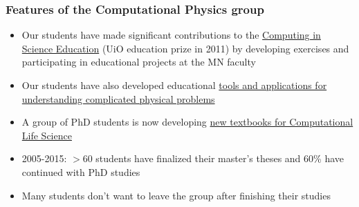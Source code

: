 \documentclass{beamer}
\begin{document}
\begin{frame}
\frametitle{Features of the Computational Physics group}

\begin{block}{}
\begin{itemize}
\item Our students have made significant contributions to  the \href{{http://www.mn.uio.no/english/about/collaboration/cse/}}{Computing in Science Education}  (UiO education prize in 2011) by developing exercises and participating in educational projects at the MN faculty

\item Our students have also developed educational \href{{http://www.mn.uio.no/fysikk/om/aktuelt/aktuelle-saker/2015/realfagsapper.html}}{tools and applications for understanding complicated physical problems}

\item A group of PhD students is now developing \href{{https://github.com/CINPLA/ibvcse}}{new textbooks for Computational Life Science}

\item 2005-2015: $> 60$ students have finalized their master's theses and 60\% have continued with PhD studies

\item Many students don't want to leave the group after finishing their studies
\end{itemize}

\noindent
\end{block}
\end{frame}
\end{document}
